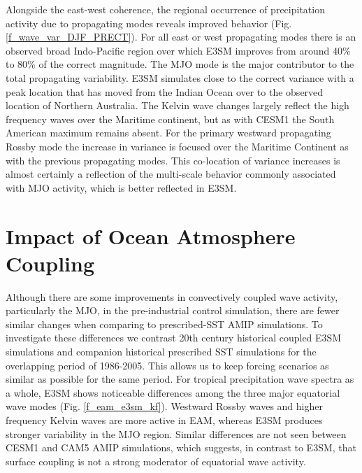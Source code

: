 \documentclass[draft,ms]{AGUTeX}
\begin{document}
\begin{article}
Alongside the east-west coherence, the regional occurrence of precipitation activity due to propagating modes reveals improved behavior (Fig. \ref{f_wave_var_DJF_PRECT}). For all east or west propagating modes there is an observed broad Indo-Pacific region over which E3SM improves from around 40\% to 80\% of the correct magnitude. The MJO mode is the major contributor to the total propagating variability. E3SM simulates close to the correct variance with a peak location that has moved from the Indian Ocean over to the observed location of Northern Australia. The Kelvin wave changes largely reflect the high frequency waves over the Maritime continent, but as with CESM1 the South American maximum remains absent. For the primary westward propagating Rossby mode the increase in variance is focused over the Maritime Continent as with the previous propagating modes. This co-location of variance increases is almost certainly a reflection of the multi-scale behavior commonly associated with MJO activity, which is better reflected in E3SM. 


\section{Impact of Ocean Atmosphere Coupling}
\label{sec:coupling}
Although there are some improvements in convectively coupled wave activity, particularly the MJO, in the pre-industrial control simulation, there are fewer similar changes when comparing to prescribed-SST AMIP simulations. To investigate these differences we contrast 20th century historical coupled E3SM simulations and companion historical prescribed SST simulations \citep[AMIP,][]{Gates1992} for the overlapping period of 1986-2005. This allows us to keep forcing scenarios as similar as possible for the same period. For tropical precipitation wave spectra as a whole, E3SM shows noticeable differences among the three major equatorial wave modes (Fig. \ref{f_eam_e3sm_kf}). Westward Rossby waves and higher frequency Kelvin waves are more active in EAM, whereas E3SM produces stronger variability in the MJO region. Similar differences are not seen between CESM1 and CAM5 AMIP simulations, which suggests, in contrast to E3SM, that surface coupling is not a strong moderator of equatorial wave activity.


\end{article}
\end{document}

